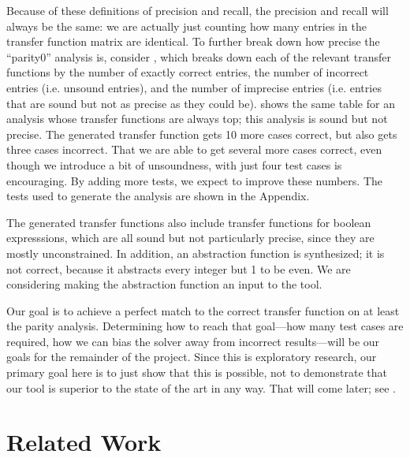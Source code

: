 \documentclass[10pt,conference]{IEEEtran}
\begin{document}
Because of these definitions of precision and recall, the
precision and recall will always be the same: we are actually just counting how
many entries in the transfer function matrix are identical. To further break
down how precise the ``parity0'' analysis is, consider , which breaks
down each of the relevant transfer functions by the number of exactly correct
entries, the number of incorrect entries (i.e. unsound entries), and the
number of imprecise entries (i.e. entries that are sound but not as precise
as they could be).  shows the same table for an analysis whose
transfer functions are always top; this analysis is sound but not precise.
The generated transfer function gets 10 more cases correct, but also gets
three cases incorrect. That we are able to get several more cases correct,
even though we introduce a bit of unsoundness, with just four test cases
is encouraging. By adding more tests, we expect to improve these numbers.
The tests used to generate the analysis are shown in the Appendix.

The generated transfer functions also include transfer functions for
boolean expresssions, which are all sound but not particularly precise,
since they are mostly unconstrained. In addition, an abstraction function
is synthesized; it is not correct, because it abstracts every integer but 1
to be even. We are considering making the abstraction function an input to
the tool.

Our goal is to achieve a perfect match to the correct transfer function
on at least the parity analysis.
Determining how to reach that goal---how many test cases are required, how
we can bias the solver away from incorrect results---will be our goals
for the remainder of the project.
Since this is exploratory research, our primary goal here
is to just show that this is possible, not to demonstrate that our tool
is superior to the state of the art in any way. That will come later;
see .

\section{Related Work}
\end{document}
